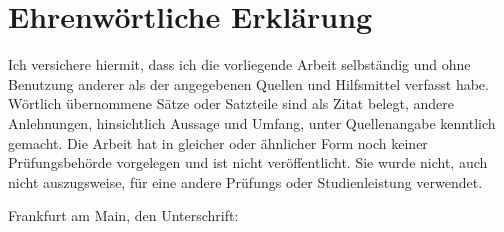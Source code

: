 \documentclass[11pt]{article}
\begin{document}
\newpage
\thispagestyle{empty}
\section*{Ehrenw\"ortliche Erkl\"arung}
\noindent
Ich versichere hiermit, dass ich die vorliegende Arbeit 
selbst\"andig und ohne Benutzung anderer als der angegebenen  Quellen  
und Hilfsmittel verfasst habe. W\"ortlich  \"ubernommene  S\"atze  oder  
Satzteile  sind  als  Zitat  belegt, andere Anlehnungen, hinsichtlich Aussage 
und Umfang, unter Quellenangabe kenntlich gemacht. Die Arbeit hat in gleicher 
oder \"ahnlicher Form noch keiner Pr\"ufungsbeh\"orde vorgelegen und ist nicht 
ver\"offentlicht. Sie wurde nicht, auch nicht auszugsweise, f\"ur eine andere 
Pr\"ufungs oder Studienleistung verwendet.
\vspace{1cm}

\noindent
Frankfurt am Main, den  \hspace{3cm} Unterschrift:
\end{document}
